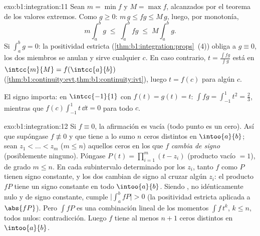 \begin{solution}{exo:b1:integration:11}
Sean $m = \min f$ y $M = \max f$, alcanzados por el teorema de los
valores extremos. Como $g \geq 0$: $m\,g \leq fg \leq M\,g$, luego,
por monotonía,
\[
m \int_a^b g \;\leq\; \int_a^b fg \;\leq\; M \int_a^b g .
\]
Si $\int_a^b g = 0$: la positividad estricta
(\cref{thm:b1:integration:props}~(4)) obliga a $g \equiv 0$, los dos
miembros se anulan y sirve cualquier $c$. En caso contrario,
$t = \frac{\int fg}{\int g}$ está en
$\intcc{m}{M} = f(\intcc{a}{b})$
(\cref{thm:b1:continuity:evt,thm:b1:continuity:ivt}), luego
$t = f(c)$ para algún $c$.

El signo importa: en $\intcc{-1}{1}$ con $f(t) = g(t) = t$:
$\int fg = \int_{-1}^1 t^2 = \frac23$, mientras que
$f(c)\int_{-1}^1 t\,\dd t = 0$ para todo $c$.
\end{solution}

\begin{solution}{exo:b1:integration:12}
Si $f \equiv 0$, la afirmación es vacía (todo punto es un cero). Así
que supóngase $f \not\equiv 0$ y que tiene a lo sumo $n$ ceros
distintos en $\intoo{a}{b}$; sean $z_1 < \dots < z_m$ ($m \leq n$)
aquellos ceros en los que $f$ \emph{cambia de signo} (posiblemente
ninguno). Póngase $P(t) = \prod_{i=1}^{m}(t - z_i)$ (producto vacío
$= 1$), de grado $m \leq n$. En cada subintervalo determinado por los
$z_i$, tanto $f$ como $P$ tienen signo constante, y los dos cambian
de signo al cruzar algún $z_i$: el producto $fP$ tiene un signo
constante en todo $\intoo{a}{b}$. Siendo , no idénticamente
nulo y de signo constante, cumple $\bigl|\int_a^b fP\bigr| > 0$ (la
positividad estricta aplicada a $\abs{fP}$). Pero $\int f P$ es una
combinación lineal de los momentos $\int f\,t^k$, $k \leq n$, todos
nulos: contradicción. Luego $f$ tiene al menos $n + 1$ ceros
distintos en $\intoo{a}{b}$.
\end{solution}

